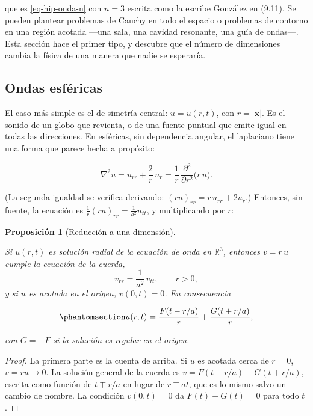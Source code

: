 \documentclass[
  spanish,
  a4paper,
]{scrbook}
\theoremstyle{definition}
\theoremstyle{plain}
\newtheorem{proposition}{Proposición}[chapter]
\theoremstyle{definition}
\theoremstyle{plain}
\theoremstyle{definition}
\theoremstyle{remark}
\begin{document}
que es \ref{eq-hip-onda-n} con \(n=3\) escrita como la escribe González
en (9.11). Se pueden plantear problemas de Cauchy en todo el espacio o
problemas de contorno en una región acotada ---una sala, una cavidad
resonante, una guía de ondas---. Esta sección hace el primer tipo, y
descubre que el número de dimensiones cambia la física de una manera que
nadie se esperaría.

\subsection{Ondas esféricas}\label{sec-hip-esfericas}

El caso más simple es el de simetría central: \(u = u(r,t)\), con
\(r = |\mathbf x|\). Es el sonido de un globo que revienta, o de una
fuente puntual que emite igual en todas las direcciones. En esféricas,
sin dependencia angular, el laplaciano tiene una forma que parece hecha
a propósito:

\[
\nabla^2u = u_{rr} + \frac2r\,u_r = \frac1r\,\frac{\partial^2}{\partial r^2}\big(r\,u\big).
\]

(La segunda igualdad se verifica derivando:
\((ru)_{rr} = r\,u_{rr} + 2u_r\).) Entonces, sin fuente, la ecuación es
\(\tfrac1r(ru)_{rr} = \tfrac1{a^2}u_{tt}\), y multiplicando por \(r\):

\begin{proposition}[Reducción a una
dimensión]\protect\hypertarget{prp-hip-esfericas}{}\label{prp-hip-esfericas}

Si \(u(r,t)\) es solución radial de la ecuación de onda en
\(\mathbb R^3\), entonces \(v = r\,u\) cumple la ecuación de la cuerda,
\[
v_{rr} = \frac1{a^2}\,v_{tt}, \qquad r>0,
\] y si \(u\) es acotada en el origen, \(v(0,t) = 0\). En consecuencia

\begin{equation}\protect\phantomsection\label{eq-hip-esfericas}{
u(r,t) = \frac{F(t - r/a)}{r} + \frac{G(t + r/a)}{r},
}\end{equation}

con \(G = -F\) si la solución es regular en el origen.

\end{proposition}

\begin{proof}
La primera parte es la cuenta de arriba. Si \(u\) es acotada cerca de
\(r=0\), \(v = ru\to0\). La solución general de la cuerda es
\(v = F(t-r/a) + G(t+r/a)\), escrita como función de \(t\mp r/a\) en
lugar de \(r\mp at\), que es lo mismo salvo un cambio de nombre. La
condición \(v(0,t) = 0\) da \(F(t) + G(t) = 0\) para todo \(t\).
\end{proof}
\end{document}
